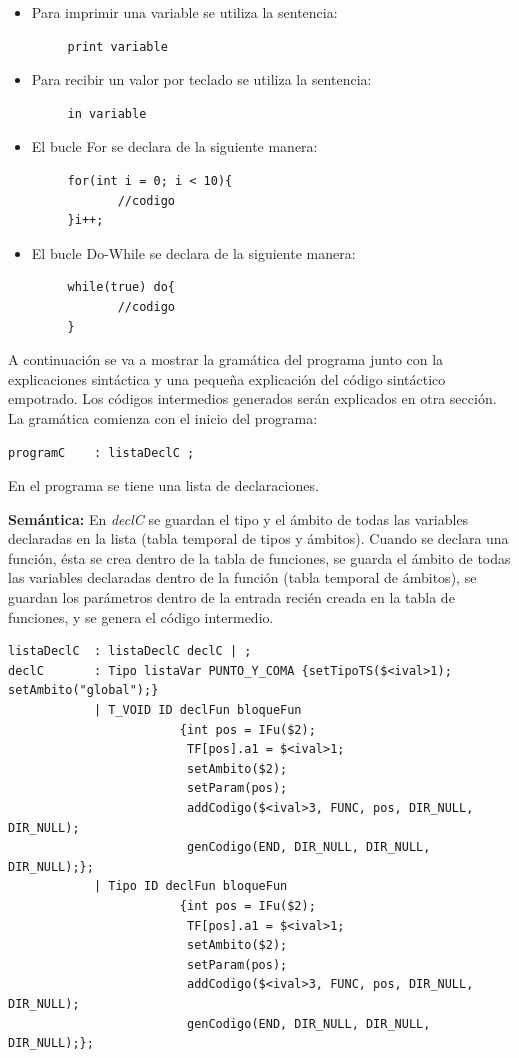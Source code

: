 \documentclass[a4paper,12pt]{article}
\begin{document}
\begin{enumerate}
\begin{enumerate}
\begin{itemize}
   \begin{itemize}
    \item Para imprimir una variable se utiliza la sentencia:
    \begin{lstlisting}
     print variable
    \end{lstlisting}
    \item Para recibir un valor por teclado se utiliza la sentencia:
    \begin{lstlisting}
     in variable
    \end{lstlisting}
    \item El bucle For se declara de la siguiente manera:
    \begin{lstlisting}
     for(int i = 0; i < 10){
		    //codigo
     }i++;
    \end{lstlisting}
    \item El bucle Do-While se declara de la siguiente manera:
    \begin{lstlisting}
     while(true) do{
		    //codigo
     }
    \end{lstlisting}
   \end{itemize}

   A continuación se va a mostrar la gramática del programa junto con la explicaciones sintáctica y
   una pequeña explicación del código sintáctico empotrado. Los códigos intermedios generados serán explicados
   en otra sección.\\
   La gramática comienza con el inicio del programa:
   \begin{lstlisting}
programC	: listaDeclC ;    
   \end{lstlisting}
   En el programa se tiene una lista de declaraciones.
   
   \textbf{Semántica:} En \textit{declC} se guardan el tipo y el ámbito de todas las variables declaradas en la lista (tabla temporal de tipos y ámbitos). 
   Cuando se declara una función, ésta se crea dentro de la tabla de funciones, se guarda el ámbito de todas las variables
   declaradas dentro de la función (tabla temporal de ámbitos), se guardan los parámetros dentro de la entrada recién creada en la tabla de funciones,
   y se genera el código intermedio.
   
   \begin{lstlisting}
listaDeclC	: listaDeclC declC | ;
declC 		: Tipo listaVar PUNTO_Y_COMA {setTipoTS($<ival>1); setAmbito("global");}
			| T_VOID ID declFun bloqueFun 
						{int pos = IFu($2);
						 TF[pos].a1 = $<ival>1;
						 setAmbito($2); 
						 setParam(pos);
						 addCodigo($<ival>3, FUNC, pos, DIR_NULL, DIR_NULL);
						 genCodigo(END, DIR_NULL, DIR_NULL, DIR_NULL);};
			| Tipo ID declFun bloqueFun 
						{int pos = IFu($2);
						 TF[pos].a1 = $<ival>1;
						 setAmbito($2); 
						 setParam(pos);
						 addCodigo($<ival>3, FUNC, pos, DIR_NULL, DIR_NULL);
						 genCodigo(END, DIR_NULL, DIR_NULL, DIR_NULL);};
    

\end{lstlisting}
\end{itemize}
\end{enumerate}
\end{enumerate}
\end{document}
